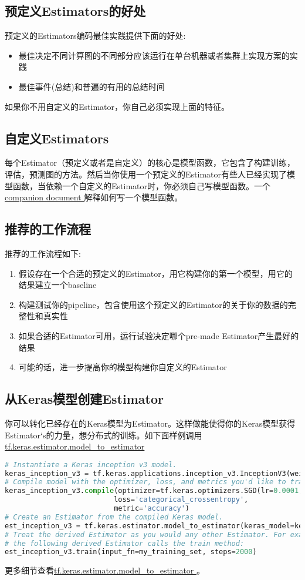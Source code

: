 \subsection{预定义Estimators的好处}
预定义的Estimators编码最佳实践提供下面的好处:
\begin{itemize}
\item 最佳决定不同计算图的不同部分应该运行在单台机器或者集群上实现方案的实践
\item 最佳事件(总结)和普遍的有用的总结时间
\end{itemize}
如果你不用自定义的Estimator，你自己必须实现上面的特征。
\subsection{自定义Estimators}
每个Estimator（预定义或者是自定义）的核心是模型函数，它包含了构建训练，评估，预测图的方法。然后当你使用一个预定义的Estimator有些人已经实现了模型函数，当依赖一个自定义的Estimator时，你必须自己写模型函数。一个\href{https://www.tensorflow.org/extend/estimators?hl=zh-cn}{ companion document }解释如何写一个模型函数。
\subsection{推荐的工作流程}
推荐的工作流程如下:
\begin{enumerate}
\item 假设存在一个合适的预定义的Estimator，用它构建你的第一个模型，用它的结果建立一个baseline
\item 构建测试你的pipeline，包含使用这个预定义的Estimator的关于你的数据的完整性和真实性
\item 如果合适的Estimator可用，运行试验决定哪个pre-made Estimator产生最好的结果
\item 可能的话，进一步提高你的模型构建你自定义的Estimator
\end{enumerate}
\subsection{从Keras模型创建Estimator}
你可以转化已经存在的Keras模型为Estimator。这样做能使得你的Keras模型获得Estimator‘s的力量，想分布式的训练。如下面样例调用\href{https://www.tensorflow.org/api_docs/python/tf/keras/estimator/model_to_estimator?hl=zh-cn}{ tf.keras.estimator.model\_to\_estimator}
\begin{lstlisting}[language=Python]
# Instantiate a Keras inception v3 model.
keras_inception_v3 = tf.keras.applications.inception_v3.InceptionV3(weights=None)
# Compile model with the optimizer, loss, and metrics you'd like to train with.
keras_inception_v3.compile(optimizer=tf.keras.optimizers.SGD(lr=0.0001, momentum=0.9),
                          loss='categorical_crossentropy',
                          metric='accuracy')
# Create an Estimator from the compiled Keras model.
est_inception_v3 = tf.keras.estimator.model_to_estimator(keras_model=keras_inception_v3)
# Treat the derived Estimator as you would any other Estimator. For example,
# the following derived Estimator calls the train method:
est_inception_v3.train(input_fn=my_training_set, steps=2000)
\end{lstlisting}
更多细节查看\href{https://www.tensorflow.org/api_docs/python/tf/keras/estimator/model_to_estimator?hl=zh-cn}{tf.keras.estimator.model\_to\_estimator }。
